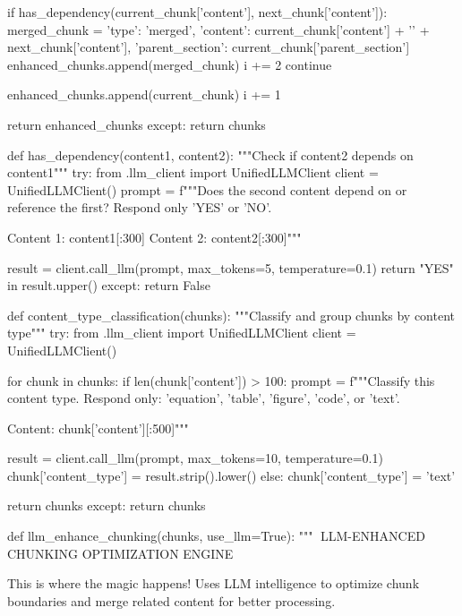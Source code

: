                 if has_dependency(current_chunk['content'], next_chunk['content']):
                    merged_chunk = {
                        'type': 'merged',
                        'content': current_chunk['content'] + '\n\n' + next_chunk['content'],
                        'parent_section': current_chunk['parent_section']
                    }
                    enhanced_chunks.append(merged_chunk)
                    i += 2
                    continue
            
            enhanced_chunks.append(current_chunk)
            i += 1
        
        return enhanced_chunks
    except:
        return chunks

def has_dependency(content1, content2):
    """Check if content2 depends on content1"""
    try:
        from .llm_client import UnifiedLLMClient
        client = UnifiedLLMClient()
        prompt = f"""Does the second content depend on or reference the first? Respond only 'YES' or 'NO'.

Content 1: {content1[:300]}
Content 2: {content2[:300]}"""
        
        result = client.call_llm(prompt, max_tokens=5, temperature=0.1)
        return "YES" in result.upper()
    except:
        return False

def content_type_classification(chunks):
    """Classify and group chunks by content type"""
    try:
        from .llm_client import UnifiedLLMClient
        client = UnifiedLLMClient()
        
        for chunk in chunks:
            if len(chunk['content']) > 100:
                prompt = f"""Classify this content type. Respond only: 'equation', 'table', 'figure', 'code', or 'text'.

Content: {chunk['content'][:500]}"""
                
                result = client.call_llm(prompt, max_tokens=10, temperature=0.1)
                chunk['content_type'] = result.strip().lower()
            else:
                chunk['content_type'] = 'text'
        
        return chunks
    except:
        return chunks

def llm_enhance_chunking(chunks, use_llm=True):
    """🧠 LLM-ENHANCED CHUNKING OPTIMIZATION ENGINE
    
    This is where the magic happens! Uses LLM intelligence to optimize
    chunk boundaries and merge related content for better processing.
    
